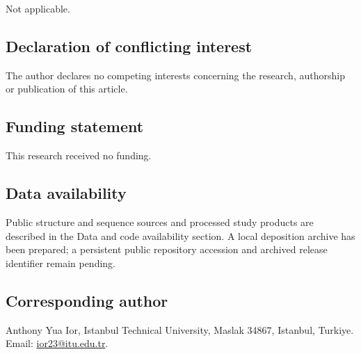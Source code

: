 \documentclass[11pt,a4paper]{article}
\begin{document}
Not applicable.

\subsection{Declaration of conflicting interest}

The author declares no competing interests concerning the research, authorship or publication of this article.

\subsection{Funding statement}

This research received no funding.

\subsection{Data availability}

Public structure and sequence sources and processed study products are described in the Data and code availability section. A local deposition archive has been prepared; a persistent public repository accession and archived release identifier remain pending.

\subsection{Corresponding author}

Anthony Yua Ior, Istanbul Technical University, Maslak 34867, Istanbul, Turkiye. Email: \href{mailto:ior23@itu.edu.tr}{ior23@itu.edu.tr}.
\end{document}
